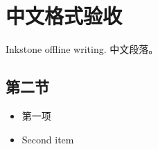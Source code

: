 \documentclass[
]{article}
\author{}
\date{}
\providecommand{\tightlist}{%
  \setlength{\itemsep}{0pt}\setlength{\parskip}{0pt}}
\begin{document}
\section{中文格式验收}\label{ux4e2dux6587ux683cux5f0fux9a8cux6536}

Inkstone offline writing. 中文段落。

\subsection{第二节}\label{ux7b2cux4e8cux8282}

\begin{itemize}
\tightlist
\item
  第一项
\item
  Second item
\end{itemize}
\end{document}
